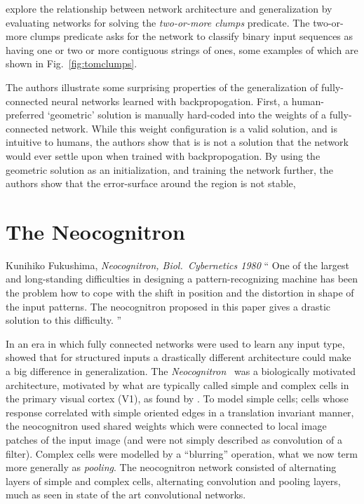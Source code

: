 \documentclass[thesis]{subfiles}
\begin{document}
	\citet{denker1987large} explore the relationship between network architecture and generalization by evaluating networks for solving the \emph{two-or-more clumps} predicate. The two-or-more clumps predicate asks for the network to classify binary input sequences as having one or two or more contiguous strings of ones, some examples of which are shown in Fig.~\ref{fig:tomclumps}. 
	
	The authors illustrate some surprising properties of the generalization of fully-connected neural networks learned with backpropogation. First, a human-preferred `geometric' solution is manually hard-coded into the weights of a fully-connected network. While this weight configuration is a valid solution, and is intuitive to humans, the authors show that is is not a solution that the network would ever settle upon when trained with backpropogation. By using the geometric solution as an initialization, and training the network further, the authors show that the error-surface around the region is not stable,
	
\section{The Neocognitron}
	\begin{chapquote}{Kunihiko Fukushima, \textit{Neocognitron, 
				Biol.\ Cybernetics 1980}}
		`` One of the largest and long-standing difficulties in designing a pattern-recognizing machine has been the problem how to cope with the shift in position and the distortion in shape of the input patterns. The neocognitron proposed in this paper gives a drastic solution to this difficulty.
		''
	\end{chapquote}
	
	In an era in which fully connected networks were used to learn any input type, \citet{Fuk80} showed that for structured inputs a drastically different architecture could make a big difference in generalization. The \emph{Neocognitron}~\citep{Fuk80, fukushima2013artificial} was a biologically motivated architecture, motivated by what are typically called simple and complex cells in the primary visual cortex (V1), as found by \citet{Hubel1959a}. To model simple cells; cells whose response correlated with simple oriented edges in a translation invariant manner, the neocognitron used shared weights which were connected to local image patches of the input image (and were not simply described as convolution of a filter). Complex cells were modelled by a ``blurring'' operation, what we now term more generally as \emph{pooling}. The neocognitron network consisted of alternating layers of simple and complex cells, \ie alternating convolution and pooling layers, much as seen in state of the art convolutional networks.
\end{document}
